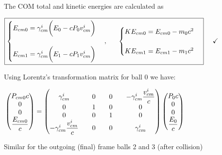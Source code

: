 \documentclass[fleqn]{article}
\begin{document}
The COM total and kinetic energies are calculated as

$
  \\
  \\
  \boxed{
    \begin{cases}
      E_{cm0}=\gamma^i_{cm} \bigg( E_0- c P_0 v^i_{cm} \bigg)
      \\
      \\
      E_{cm1}=\gamma^i_{cm} \bigg( E_1- c P_1 v^i_{cm} \bigg)
    \end{cases}, ~~~~~ 
    \begin{cases}
      KE_{cm0}=E_{cm0}-m_0 c^2
      \\
      \\
      KE_{cm1}=E_{cm1}-m_1 c^2
    \end{cases}
  } ~~~~ \checkmark
  \\
  \\
$

Using Lorentz's transformation matrix for ball 0 we have:

$
  \\
  \\
  \begin{pmatrix}
    P_{cm0} c
    \\
    0
    \\
    0
    \\
    \dfrac{E_{cm0}}{c}
  \end{pmatrix}=
  \begin{pmatrix}
    \gamma^i_{cm} && 0 && 0 && -\gamma^i_{cm} \dfrac{v^i_{cm}}{c}
    \\
    0 && 1 && 0 && 0
    \\
    0 && 0 && 1 && 0
    \\
    -\gamma^i_{cm} \dfrac{v^i_{cm}}{c} && 0 && 0 && \gamma^i_{cm}
  \end{pmatrix}
  \begin{pmatrix}
    P_0 c
    \\
    0
    \\
    0
    \\
    \dfrac{E_0}{c}
  \end{pmatrix}
  \\
  \\
$

Similar for the outgoing (final) frame balls 2 and 3 (after collision)
\end{document}
